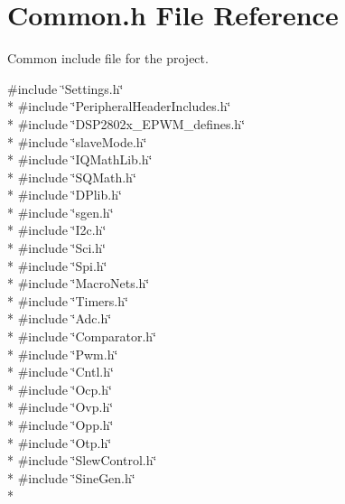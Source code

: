 \hypertarget{a00015}{\section{Common.\-h File Reference}
\label{a00015}
}


Common include file for the project.  


{\ttfamily \#include \char`\"{}Settings.\-h\char`\"{}}\\*
{\ttfamily \#include \char`\"{}Peripheral\-Header\-Includes.\-h\char`\"{}}\\*
{\ttfamily \#include \char`\"{}D\-S\-P2802x\-\_\-\-E\-P\-W\-M\-\_\-defines.\-h\char`\"{}}\\*
{\ttfamily \#include \char`\"{}slave\-Mode.\-h\char`\"{}}\\*
{\ttfamily \#include \char`\"{}I\-Q\-Math\-Lib.\-h\char`\"{}}\\*
{\ttfamily \#include \char`\"{}S\-Q\-Math.\-h\char`\"{}}\\*
{\ttfamily \#include \char`\"{}D\-Plib.\-h\char`\"{}}\\*
{\ttfamily \#include \char`\"{}sgen.\-h\char`\"{}}\\*
{\ttfamily \#include \char`\"{}I2c.\-h\char`\"{}}\\*
{\ttfamily \#include \char`\"{}Sci.\-h\char`\"{}}\\*
{\ttfamily \#include \char`\"{}Spi.\-h\char`\"{}}\\*
{\ttfamily \#include \char`\"{}Macro\-Nets.\-h\char`\"{}}\\*
{\ttfamily \#include \char`\"{}Timers.\-h\char`\"{}}\\*
{\ttfamily \#include \char`\"{}Adc.\-h\char`\"{}}\\*
{\ttfamily \#include \char`\"{}Comparator.\-h\char`\"{}}\\*
{\ttfamily \#include \char`\"{}Pwm.\-h\char`\"{}}\\*
{\ttfamily \#include \char`\"{}Cntl.\-h\char`\"{}}\\*
{\ttfamily \#include \char`\"{}Ocp.\-h\char`\"{}}\\*
{\ttfamily \#include \char`\"{}Ovp.\-h\char`\"{}}\\*
{\ttfamily \#include \char`\"{}Opp.\-h\char`\"{}}\\*
{\ttfamily \#include \char`\"{}Otp.\-h\char`\"{}}\\*
{\ttfamily \#include \char`\"{}Slew\-Control.\-h\char`\"{}}\\*
{\ttfamily \#include \char`\"{}Sine\-Gen.\-h\char`\"{}}\\*
